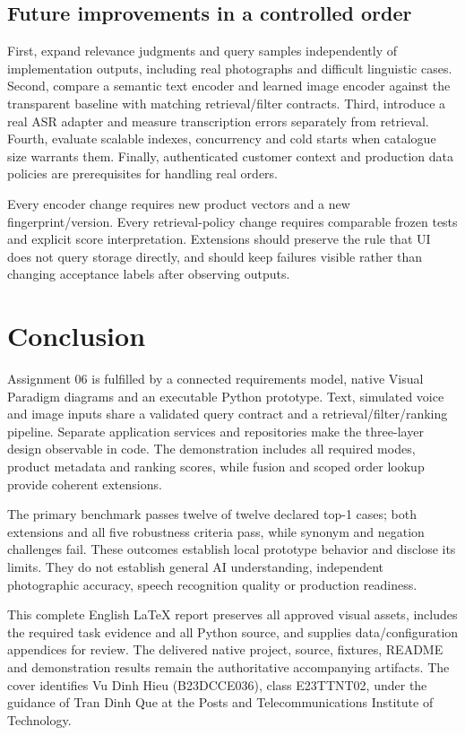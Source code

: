 \documentclass[11pt,a4paper]{article}
\begin{document}
\subsection{Future improvements in a controlled order}
First, expand relevance judgments and query samples independently of implementation outputs, including real photographs and difficult linguistic cases. Second, compare a semantic text encoder and learned image encoder against the transparent baseline with matching retrieval/filter contracts. Third, introduce a real ASR adapter and measure transcription errors separately from retrieval. Fourth, evaluate scalable indexes, concurrency and cold starts when catalogue size warrants them. Finally, authenticated customer context and production data policies are prerequisites for handling real orders.

Every encoder change requires new product vectors and a new fingerprint/version. Every retrieval-policy change requires comparable frozen tests and explicit score interpretation. Extensions should preserve the rule that UI does not query storage directly, and should keep failures visible rather than changing acceptance labels after observing outputs.

\section{Conclusion}\label{sec:conclusion}
Assignment 06 is fulfilled by a connected requirements model, native Visual Paradigm diagrams and an executable Python prototype. Text, simulated voice and image inputs share a validated query contract and a retrieval/filter/ranking pipeline. Separate application services and repositories make the three-layer design observable in code. The demonstration includes all required modes, product metadata and ranking scores, while fusion and scoped order lookup provide coherent extensions.

The primary benchmark passes twelve of twelve declared top-1 cases; both extensions and all five robustness criteria pass, while synonym and negation challenges fail. These outcomes establish local prototype behavior and disclose its limits. They do not establish general AI understanding, independent photographic accuracy, speech recognition quality or production readiness.

This complete English LaTeX report preserves all approved visual assets, includes the required task evidence and all Python source, and supplies data/configuration appendices for review. The delivered native project, source, fixtures, README and demonstration results remain the authoritative accompanying artifacts. The cover identifies Vu Dinh Hieu (B23DCCE036), class E23TTNT02, under the guidance of Tran Dinh Que at the Posts and Telecommunications Institute of Technology.
\end{document}

